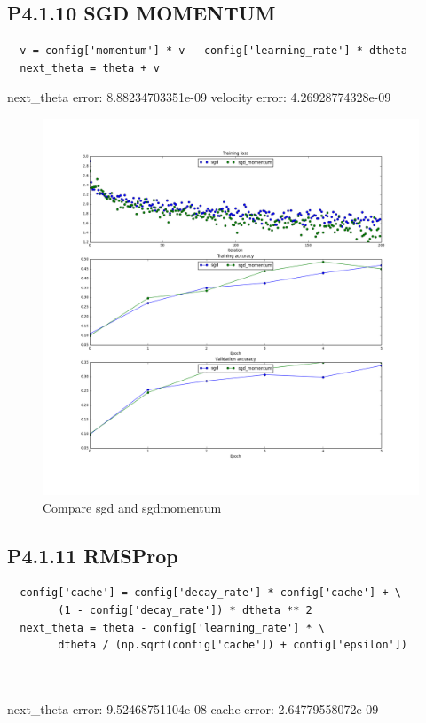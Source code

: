 \documentclass[12pt]{article}
\begin{document}
\subsection*{P4.1.10 SGD MOMENTUM}
\begin{lstlisting}
  v = config['momentum'] * v - config['learning_rate'] * dtheta
  next_theta = theta + v
\end{lstlisting}
next\_theta error:  8.88234703351e-09
velocity error:  4.26928774328e-09
\begin{figure}[H]
  \caption{Compare sgd and sgdmomentum}
  \centering
    \includegraphics[scale=0.5]{six.png}
\end{figure}


\subsection*{P4.1.11 RMSProp}
\begin{lstlisting}
  config['cache'] = config['decay_rate'] * config['cache'] + \
        (1 - config['decay_rate']) * dtheta ** 2
  next_theta = theta - config['learning_rate'] * \
        dtheta / (np.sqrt(config['cache']) + config['epsilon'])



\end{lstlisting}

next\_theta error:  9.52468751104e-08
cache error:  2.64779558072e-09
\end{document}
